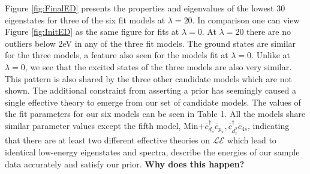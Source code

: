 \documentclass{article}
\begin{document}
Figure \ref{fig:FinalED} presents the properties and eigenvalues of the lowest 30 eigenstates for three of the six fit models at $\lambda = 20$. 
In comparison one can view Figure \ref{fig:InitED} as the same figure for fits at $\lambda = 0$. 
At $\lambda = 20$ there are no outliers below 2eV in any of the three fit models. 
The ground states are similar for the three models, a feature also seen for the models fit at $\lambda = 0$.
Unlike at $\lambda = 0$, we see that the excited states of the three models are also very similar.
This pattern is also shared by the three other candidate models which are not shown. 
The additional constraint from asserting a prior has seemingly caused a single effective theory to emerge from our set of candidate models.
The values of the fit parameters for our six models can be seen in Table 1.
All the models share similar parameter values except the fifth model, Min$ + \bar{c}_{d_\pi}^\dagger \bar{c}_{p_\pi}, \bar{c}_{d_z^2}^\dagger \bar{c}_{4s}$, indicating that there are at least two different effective theories on $\mathcal{LE}$ which lead to identical low-energy eigenstates and spectra, describe the energies of our sample data accurately and satisfy our prior.
\textbf{Why does this happen?}
\end{document}
